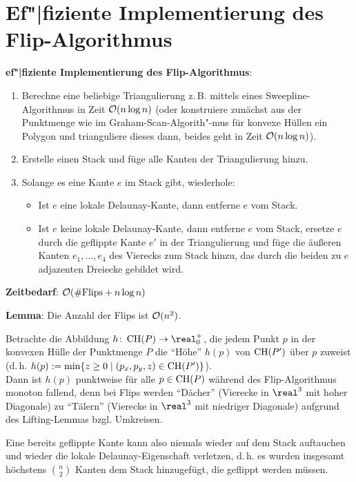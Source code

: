 \pagebreak

\section{%
    Ef"|fiziente Implementierung des Flip-Algorithmus%
}

\textbf{ef"|fiziente Implementierung des Flip-Algorithmus}:
\begin{enumerate}
    \item
    Berechne eine beliebige Triangulierung z.\,B. mittels eines Sweepline-Algorithmus in Zeit
    $\mathcal{O}(n \log n)$
    (oder konstruiere zunächst aus der Punktmenge wie im Graham-Scan-Algorith"-mus
    für konvexe Hüllen ein Polygon und trianguliere dieses dann, beides geht in Zeit
    $\mathcal{O}(n \log n)$).

    \item
    Erstelle einen Stack und füge alle Kanten der Triangulierung hinzu.

    \item
    Solange es eine Kante $e$ im Stack gibt, wiederhole:
    \begin{itemize}
        \item
        Ist $e$ eine lokale Delaunay-Kante, dann entferne $e$ vom Stack.

        \item
        Ist $e$ keine lokale Delaunay-Kante, dann entferne $e$ vom Stack,
        ersetze $e$ durch die geflippte Kante $e'$ in der Triangulierung und
        füge die äußeren Kanten $e_1, \dotsc, e_4$ des Vierecks zum Stack hinzu,
        das durch die beiden zu $e$ adjazenten Dreiecke gebildet wird.
    \end{itemize}
\end{enumerate}

\textbf{Zeitbedarf}: $\mathcal{O}(\text{\#Flips} + n\log n)$

\linie

\textbf{Lemma}:
Die Anzahl der Flips ist $\mathcal{O}(n^2)$.

\begin{Beweis}
    Betrachte die Abbildung $h\colon \CH(P) \rightarrow \real_0^+$,
    die jedem Punkt $p$ in der konvexen
    Hülle der Punktmenge $P$ die "`Höhe"' $h(p)$ von $\operatorname{CH}(P')$ über $p$ zuweist\\
    (d.\,h. $h(p) := \min\{z \ge 0 \;|\; (p_x, p_y, z) \in \operatorname{CH}(P')\}$).\\
    Dann ist $h(p)$ punktweise für alle $p \in \operatorname{CH}(P)$ während des Flip-Algorithmus monoton
    fallend, denn bei Flips werden "`Dächer"'
    (Vierecke in $\real^3$ mit hoher Diagonale)
    zu "`Tälern"' (Vierecke in $\real^3$ mit niedriger Diagonale)
    aufgrund des Lifting-Lemmas bzgl. Umkreisen.

    Eine bereits geflippte Kante kann also niemals wieder auf dem Stack auftauchen
    und wieder die lokale Delaunay-Eigenschaft verletzen,
    d.\,h. es wurden insgesamt höchstens $\binom{n}{2}$ Kanten dem Stack hinzugefügt,
    die geflippt werden müssen.
\end{Beweis}

